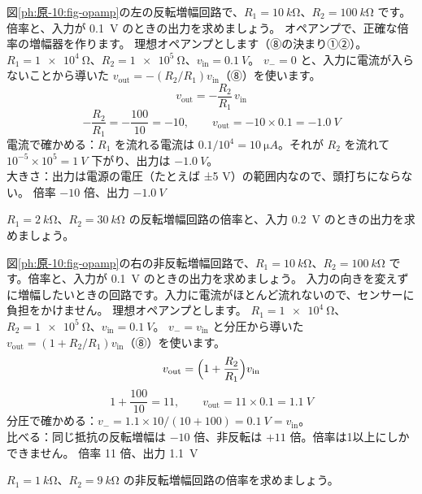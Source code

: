 \label{ph:原-10:ex6}
\begin{phreidai}[反転増幅回路]
図\ref{ph:原-10:fig-opamp}の左の反転増幅回路で、$R_1=\qty{10}{k\ohm}$、$R_2=\qty{100}{k\ohm}$ です。倍率と、入力が \qty{0.1}{V} のときの出力を求めましょう。
\phbamen
オペアンプで、正確な倍率の増幅器を作ります。
\phmushi
理想オペアンプとします（⑧の決まり①②）。
\phzu
$R_1=\qty{1e4}{\ohm}$、$R_2=\qty{1e5}{\ohm}$、$v_{\mathrm{in}}=\qty{0.1}{V}$。
\phriyu
$v_-=0$ と、入力に電流が入らないことから導いた $v_{\mathrm{out}}=-(R_2/R_1)v_{\mathrm{in}}$（⑧）を使います。
\phtateru
\[ v_{\mathrm{out}}=-\frac{R_2}{R_1}\,v_{\mathrm{in}} \]
\phtoku
\[ -\frac{R_2}{R_1}=-\frac{100}{10}=-10,\qquad v_{\mathrm{out}}=-10\times0.1=\qty{-1.0}{V} \]
\phtashikame
電流で確かめる：$R_1$ を流れる電流は $0.1/10^4=\qty{10}{\micro A}$。それが $R_2$ を流れて $10^{-5}\times10^5=\qty{1}{V}$ 下がり、出力は $\qty{-1.0}{V}$。\\
大きさ：出力は電源の電圧（たとえば ±5 V）の範囲内なので、頭打ちにならない。
\kotae 倍率 $-10$ 倍、出力 $\qty{-1.0}{V}$
\end{phreidai}
\begin{jibun}
$R_1=\qty{2}{k\ohm}$、$R_2=\qty{30}{k\ohm}$ の反転増幅回路の倍率と、入力 \qty{0.2}{V} のときの出力を求めましょう。
\end{jibun}

\label{ph:原-10:ex7}
\begin{phreidai}[非反転増幅回路]
図\ref{ph:原-10:fig-opamp}の右の非反転増幅回路で、$R_1=\qty{10}{k\ohm}$、$R_2=\qty{100}{k\ohm}$ です。倍率と、入力が \qty{0.1}{V} のときの出力を求めましょう。
\phbamen
入力の向きを変えずに増幅したいときの回路です。入力に電流がほとんど流れないので、センサーに負担をかけません。
\phmushi
理想オペアンプとします。
\phzu
$R_1=\qty{1e4}{\ohm}$、$R_2=\qty{1e5}{\ohm}$、$v_{\mathrm{in}}=\qty{0.1}{V}$。
\phriyu
$v_-=v_{\mathrm{in}}$ と分圧から導いた $v_{\mathrm{out}}=(1+R_2/R_1)v_{\mathrm{in}}$（⑧）を使います。
\phtateru
\[ v_{\mathrm{out}}=\Bigl(1+\frac{R_2}{R_1}\Bigr)v_{\mathrm{in}} \]
\phtoku
\[ 1+\frac{100}{10}=11,\qquad v_{\mathrm{out}}=11\times0.1=\qty{1.1}{V} \]
\phtashikame
分圧で確かめる：$v_-=1.1\times10/(10+100)=\qty{0.1}{V}=v_{\mathrm{in}}$。\\
比べる：同じ抵抗の反転増幅は $-10$ 倍、非反転は $+11$ 倍。倍率は1以上にしかできません。
\kotae 倍率 11 倍、出力 \qty{1.1}{V}
\end{phreidai}
\begin{jibun}
$R_1=\qty{1}{k\ohm}$、$R_2=\qty{9}{k\ohm}$ の非反転増幅回路の倍率を求めましょう。
\end{jibun}

